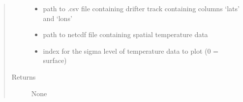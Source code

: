 \documentclass[letterpaper,10pt,english]{sphinxmanual}
\begin{document}
\begin{fulllineitems}
\begin{quote}
\begin{description}
\begin{itemize}
\item {} 
\sphinxAtStartPar
{} \textendash{} path to .csv file containing drifter track containing columns ‘lats’
and ‘lons’

\item {} 
\sphinxAtStartPar
{} \textendash{} path to netcdf file containing spatial temperature data

\item {} 
\sphinxAtStartPar
{} \textendash{} index for the sigma level of temperature data to plot (0 = surface)

\end{itemize}

\item[{Returns}] \leavevmode
\sphinxAtStartPar
None

\end{description}\end{quote}

\end{fulllineitems}

\end{document}
